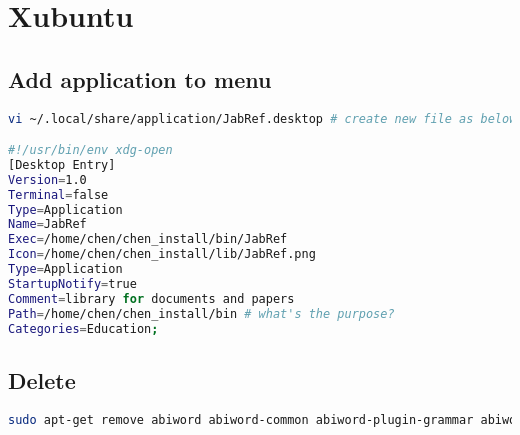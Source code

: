 \chapter{Xubuntu}


\section{Add application to menu}

\begin{lstlisting}[language=bash, caption={Add JabRef to menu}]
vi ~/.local/share/application/JabRef.desktop # create new file as below

#!/usr/bin/env xdg-open
[Desktop Entry]
Version=1.0
Terminal=false
Type=Application
Name=JabRef
Exec=/home/chen/chen_install/bin/JabRef
Icon=/home/chen/chen_install/lib/JabRef.png
Type=Application
StartupNotify=true
Comment=library for documents and papers
Path=/home/chen/chen_install/bin # what's the purpose?
Categories=Education;
\end{lstlisting}

\section{Delete}
\begin{lstlisting}[language=bash, caption={delete Xubuntu desktop I (2013)}]
sudo apt-get remove abiword abiword-common abiword-plugin-grammar abiword-plugin-mathview alacarte bison blueman brltty-x11 catfish docbook-xml exo-utils flex fonts-droid gigolo gimp gimp-data gmusicbrowser gnome-desktop-data gnome-system-tools gnome-time-admin gnumeric gnumeric-common gnumeric-doc gstreamer0.10-gnomevfs gthumb gthumb-data gtk2-engines-pixbuf indicator-application-gtk2 indicator-messages-gtk2 indicator-sound-gtk2 indicator-status-provider-pidgin leafpad libabiword-2.9 libao-common libao4 libaudio-scrobbler-perl libbabl-0.0-0 libbison-dev libcolamd2.7.1 libconfig-inifiles-perl libdigest-crc-perl libencode-locale-perl libept1.4.12 libexo-1-0 libexo-common libexo-helpers libfile-listing-perl libfl-dev libfont-afm-perl libgarcon-1-0 libgarcon-common libgdome2-0 libgdome2-cpp-smart0c2a libgegl-0.0-0 libgimp2.0 libglade2-0 libgnomevfs2-0 libgnomevfs2-common libgnomevfs2-extra libgoffice-0.8-8 libgoffice-0.8-8-common libgsf-1-114 libgsf-1-common libgstreamer-perl libgtk2-notify-perl libgtk2-trayicon-perl libgtkmathview0c2a libgtkspell0 libhtml-form-perl libhtml-format-perl libhtml-parser-perl libhtml-tagset-perl libhtml-tree-perl libhttp-cookies-perl libhttp-daemon-perl libhttp-date-perl libhttp-message-perl libhttp-negotiate-perl libid3tag0 libido-0.1-0 libilmbase6 libio-socket-inet6-perl libio-socket-ssl-perl libjavascriptcoregtk-1.0-0 libjpeg-progs libjpeg-turbo-progs libkeybinder0 liblaunchpad-integration1 liblink-grammar4 libloudmouth1-0 liblwp-mediatypes-perl liblwp-protocol-https-perl libmad0 libmailtools-perl libnet-dbus-perl libnet-http-perl libnet-ssleay-perl liboobs-1-5 libopenexr6 libotr2 libots0 librarian0 libsexy2 libsocket6-perl libtagc0 libthunarx-2-0 
\end{lstlisting}

